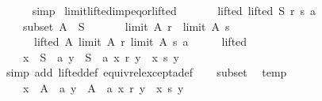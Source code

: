 \begin{isabellebody}
\ \ \ \ \isamarkupfalse%
\ simp\isanewline
{}\isamarkupfalse%
%
\endisatagproof
{\isafoldproof}%
%
\isadelimproof
\isanewline
%
\endisadelimproof
\isanewline
{}\isamarkupfalse%
\ limit{\isacharunderscore}{\kern0pt}lifted{\isacharunderscore}{\kern0pt}imp{\isacharunderscore}{\kern0pt}eq{\isacharunderscore}{\kern0pt}or{\isacharunderscore}{\kern0pt}lifted{\isacharcolon}{\kern0pt}\isanewline
\ \ \isanewline
\ \ \ \ lifted{\isacharcolon}{\kern0pt}\ {\isachardoublequoteopen}lifted\ S\ r\ s\ a{\isachardoublequoteclose}\ \isanewline
\ \ \ \ subset{\isacharcolon}{\kern0pt}\ {\isachardoublequoteopen}A\ {\isasymsubseteq}\ S{\isachardoublequoteclose}\isanewline
\ \ \isanewline
\ \ \ \ {\isachardoublequoteopen}limit\ A\ r\ {\isacharequal}{\kern0pt}\ limit\ A\ s\ {\isasymor}\isanewline
\ \ \ \ \ \ lifted\ A\ {\isacharparenleft}{\kern0pt}limit\ A\ r{\isacharparenright}{\kern0pt}\ {\isacharparenleft}{\kern0pt}limit\ A\ s{\isacharparenright}{\kern0pt}\ a{\isachardoublequoteclose}\isanewline
%
\isadelimproof
%
\endisadelimproof
%
\isatagproof
{}\isamarkupfalse%
\ {\isacharminus}{\kern0pt}\isanewline
\ \ \isamarkupfalse%
\ lifted\ \isamarkupfalse%
\isanewline
\ \ \ \ {\isachardoublequoteopen}{\isasymforall}x\ {\isasymin}\ S\ {\isacharminus}{\kern0pt}\ {\isacharbraceleft}{\kern0pt}a{\isacharbraceright}{\kern0pt}{\isachardot}{\kern0pt}\ {\isasymforall}y\ {\isasymin}\ S\ {\isacharminus}{\kern0pt}\ {\isacharbraceleft}{\kern0pt}a{\isacharbraceright}{\kern0pt}{\isachardot}{\kern0pt}\ x\ {\isasympreceq}\isactrlsub r\ y\ {\isasymlongleftrightarrow}\ x\ {\isasympreceq}\isactrlsub s\ y{\isachardoublequoteclose}\isanewline
\ \ \ \ \isamarkupfalse%
\ {\isacharparenleft}{\kern0pt}simp\ add{\isacharcolon}{\kern0pt}\ lifted{\isacharunderscore}{\kern0pt}def\ equiv{\isacharunderscore}{\kern0pt}rel{\isacharunderscore}{\kern0pt}except{\isacharunderscore}{\kern0pt}a{\isacharunderscore}{\kern0pt}def{\isacharparenright}{\kern0pt}\isanewline
\ \ \isamarkupfalse%
\ subset\ \isamarkupfalse%
\ temp{\isacharcolon}{\kern0pt}\isanewline
\ \ \ \ {\isachardoublequoteopen}{\isasymforall}x\ {\isasymin}\ A\ {\isacharminus}{\kern0pt}\ {\isacharbraceleft}{\kern0pt}a{\isacharbraceright}{\kern0pt}{\isachardot}{\kern0pt}\ {\isasymforall}y\ {\isasymin}\ A\ {\isacharminus}{\kern0pt}\ {\isacharbraceleft}{\kern0pt}a{\isacharbraceright}{\kern0pt}{\isachardot}{\kern0pt}\ x\ {\isasympreceq}\isactrlsub r\ y\ {\isasymlongleftrightarrow}\ x\ {\isasympreceq}\isactrlsub s\ y{\isachardoublequoteclose}\isanewline

\end{isabellebody}
